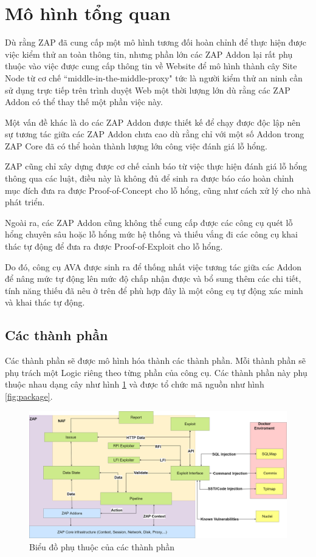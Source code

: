 \documentclass[./../main.tex]{subfiles}
\begin{document}
\section{Mô hình tổng quan}

Dù rằng ZAP đã cung cấp một mô hình tương đối hoàn chỉnh để thực hiện được
việc kiểm thử an toàn thông tin, nhưng phần lớn các ZAP Addon lại rất
phụ thuộc vào việc được cung cấp thông tin về Website để mô hình thành
cây Site Node từ cơ chế “middle-in-the-middle-proxy" tức là người kiểm
thử an ninh cần sử dụng trực tiếp trên trình duyệt Web một thời lượng lớn
dù rằng các ZAP Addon có thể thay thế một phần việc này.

Một vấn đề khác là do các ZAP Addon được thiết kế để chạy được độc lập
nên sự tương tác giữa các ZAP Addon chưa cao dù rằng chỉ với một số Addon
trong ZAP Core đã có thể hoàn thành lượng lớn công việc đánh giá lỗ hổng.

ZAP cũng chỉ xây dựng được cơ chế cảnh báo từ việc thực hiện đánh giá
lỗ hổng thông qua các luật, điều này là không đủ để sinh ra được báo
cáo hoàn chỉnh mục đích đưa ra được Proof-of-Concept cho lỗ hổng, cũng
như cách xử lý cho nhà phát triển.

Ngoài ra, các ZAP Addon cũng không thể cung cấp được các công cụ quét
lỗ hổng chuyên sâu hoặc lỗ hổng mức hệ thống và thiếu vắng đi các công
cụ khai thác tự động để đưa ra được Proof-of-Exploit cho lỗ hổng.

Do đó, công cụ AVA được sinh ra để thống nhất việc tương tác giữa các
Addon để nâng mức tự động lên mức độ chấp nhận được và bổ sung thêm
các chi tiết, tính năng thiếu đã nêu ở trên để phù hợp đây là một công
cụ tự động xác minh và khai thác tự động.

\subsection{Các thành phần}
Các thành phần sẽ được mô hình hóa thành các thành phần. Mỗi thành phần
sẽ phụ trách một Logic riêng theo từng phần của công cụ. Các thành phần
này phụ thuộc nhau dạng cây như hình \ref{fig:component} và được tổ chức
mã nguồn như hình \ref{fig:package}.

\begin{figure}[ht!]
	\includegraphics[width=\linewidth]{./images/component.png}
	\caption{Biểu đồ phụ thuộc của các thành phần}
	\label{fig:component}
\end{figure}
\end{document}
